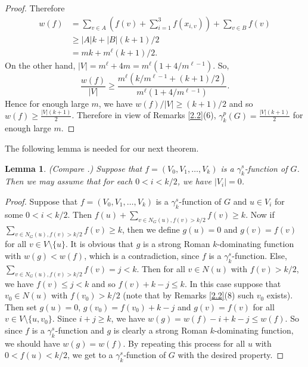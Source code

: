 \documentclass[12pt]{amsart}
\newtheorem{lemma}[theorem]{Lemma}
\begin{document}
\begin{proof}
 Therefore
\begin{align*}
w(f)&=\sum_{v\in A}(f(v)+\sum_{i=1}^3f(x_{i,v}))+\sum_{v\in B}f(v)\\
&\geq |A|k+|B|(k+1)/2\\
&= mk+m^\ell (k+1)/2.
\end{align*}
On the other hand, $|V|=m^\ell+4m=m^\ell (1+4/m^{\ell -1})$. So, 
$$\frac{w(f)}{|V|}\geq \frac{m^\ell (k/m^{\ell -1}+(k+1)/2)}{m^\ell (1+4/m^{\ell -1})}.$$
Hence for enough large $m$, we have $w(f)/|V|\geq (k+1)/2$ and so $w(f)\geq \frac{|V|(k+1)}{2}$. Therefore in view of Remarks \ref{2.2}(6),
$\gamma_k^p(G)=\frac{|V|(k+1)}{2}$ for enough large $m$.
\end{proof}

The following lemma is needed for our next theorem.
\begin{lemma}(Compare \cite[Proposition 1]{double}.) \label{2.3}
Suppose that $f=(V_0, V_1, \dots , V_k)$ is a $\gamma^s_k$-function of $G$. Then we may assume that for each $0<i<k/2$, we have $|V_i|=0$. 
\end{lemma}
\begin{proof}
Suppose that $f=(V_0, V_1, \dots , V_k)$ is a $\gamma^s_k$-function of $G$ and $u\in V_i$ for some $0<i <k/2$. Then
 $f(u)+\sum_{v\in N_G(u), f(v)>k/2}f(v)\geq k$. Now if $\sum_{v\in N_G(u), f(v)>k/2}f(v)\geq k$, then we define $g(u)=0$ and $g(v)=f(v)$ for all $v\in V\setminus \{u\}$. It is obvious that $g$ is a strong Roman $k$-dominating function with $w(g)<w(f)$, which is a contradiction, since $f$ is a $\gamma^s_k$-function. Else, $\sum_{v\in N_G(u), f(v)>k/2}f(v)=j<k$. Then for all $v\in N(u)$ with $f(v)>k/2$, we have $f(v)\leq j <k$ and so $f(v)+k-j\leq k$. In this case suppose that $v_0\in N(u)$ with $f(v_0)>k/2$ (note that by Remarks \ref{2.2}(8) such $v_0$ exists). Then set $g(u)=0$, $g(v_0)=f(v_0)+k-j$ and $g(v)=f(v)$ for all $v\in V\setminus \{u, v_0\}$. Since $i+j\geq k$, we have $w(g)=w(f)-i+k-j\leq w(f)$. So since $f$ is a $\gamma^s_k$-function and $g$ is clearly a strong Roman $k$-dominating function, we should have $w(g)=w(f)$. By repeating this process for all $u$ with $0<f(u)<k/2$, we get to a $\gamma_k^s$-function of $G$ with the desired property.
\end{proof}
\end{document}
